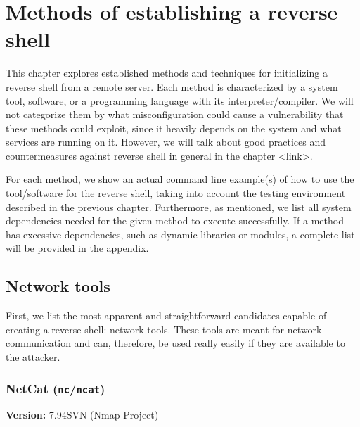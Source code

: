 \newcommand{\dpd}[1]{\begin{adjustwidth}{10pt}{0pt}\small \textbf{Dependencies:} #1 \end{adjustwidth}}
\newcommand{\notte}[1]{\begin{adjustwidth}{10pt}{0pt} \small \textbf{Note:} #1 \end{adjustwidth}}
\newcommand{\version}[1]{\textbf{Version:} #1}

\chapter{Methods of establishing a reverse shell}
\label{chap:methods}

This chapter explores established methods and techniques for initializing a reverse shell from a remote server. Each method is characterized by a system tool, software, or a programming language with its interpreter/compiler. We will not categorize them by what misconfiguration could cause a vulnerability that these methods could exploit, since it heavily depends on the system and what services are running on it. However, we will talk about good practices and countermeasures against reverse shell in general in the chapter <link>.

For each method, we show an actual command line example(s) of how to use the tool/software for the reverse shell, taking into account the testing environment described in the previous chapter. Furthermore, as mentioned, we list all system dependencies needed for the given method to execute successfully. If a method has excessive dependencies, such as dynamic libraries or modules, a complete list will be provided in the appendix.


\section{Network tools}

First, we list the most apparent and straightforward candidates capable of creating a reverse shell: network tools. These tools are meant for network communication and can, therefore, be used really easily if they are available to the attacker.


\subsection{NetCat (\texttt{nc}/\texttt{ncat})}

\version{7.94SVN (Nmap Project)}


